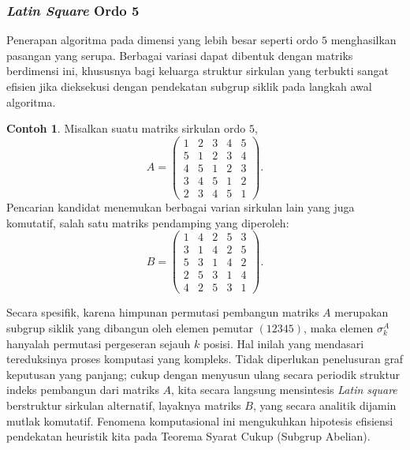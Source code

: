 \documentclass[journal]{IEEEtran}
\theoremstyle{definition}
\newtheorem{con}{Contoh}[section]
\theoremstyle{plain}
\begin{document}
\subsubsection{\textit{Latin Square} Ordo 5}
Penerapan algoritma pada dimensi yang lebih besar seperti ordo $5$ menghasilkan pasangan yang serupa. Berbagai variasi dapat dibentuk dengan matriks berdimensi ini, khususnya bagi keluarga struktur sirkulan yang terbukti sangat efisien jika dieksekusi dengan pendekatan subgrup siklik pada langkah awal algoritma.
\begin{con}
    Misalkan suatu matriks sirkulan ordo $5$,
    \begin{equation}
        A=
        \begin{pmatrix}
            1 & 2 & 3 & 4 & 5 \\
            5 & 1 & 2 & 3 & 4 \\
            4 & 5 & 1 & 2 & 3 \\
            3 & 4 & 5 & 1 & 2 \\
            2 & 3 & 4 & 5 & 1
        \end{pmatrix}.
    \end{equation}
    Pencarian kandidat menemukan berbagai varian sirkulan lain yang juga komutatif, salah satu matriks pendamping yang diperoleh:
    \begin{equation}
        B=
        \begin{pmatrix}
            1 & 4 & 2 & 5 & 3 \\
            3 & 1 & 4 & 2 & 5 \\
            5 & 3 & 1 & 4 & 2 \\
            2 & 5 & 3 & 1 & 4 \\
            4 & 2 & 5 & 3 & 1
        \end{pmatrix}.
    \end{equation}

    Secara spesifik, karena himpunan permutasi pembangun matriks $A$ merupakan subgrup siklik yang dibangun oleh elemen pemutar $(1 2 3 4 5)$, maka elemen $\sigma_k^A$ hanyalah permutasi pergeseran sejauh $k$ posisi. Hal inilah yang mendasari tereduksinya proses komputasi yang kompleks. Tidak diperlukan penelusuran graf keputusan yang panjang; cukup dengan menyusun ulang secara periodik struktur indeks pembangun dari matriks $A$, kita secara langsung mensintesis \textit{Latin square} berstruktur sirkulan alternatif, layaknya matriks $B$, yang secara analitik dijamin mutlak komutatif. Fenomena komputasional ini mengukuhkan hipotesis efisiensi pendekatan heuristik kita pada Teorema Syarat Cukup (Subgrup Abelian).


\end{con}
\end{document}
